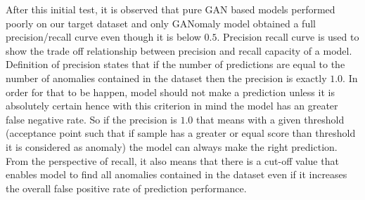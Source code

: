 After this initial test, it is observed that pure GAN based models performed poorly on our target
dataset and only GANomaly model obtained a full precision/recall curve even though it is below
$0.5$. Precision recall curve is used to show the trade off relationship between precision and
recall capacity of a model. Definition of precision states that if the number of predictions are
equal to the number of anomalies contained in the dataset then the precision is exactly $1.0$. In
order for that to be happen, model should not make a prediction unless it is absolutely certain
hence with this criterion in mind the model has an greater false negative rate. So if the precision
is $1.0$ that means with a given threshold (acceptance point such that if sample has a greater or
equal score than threshold it is considered as anomaly) the model can always make the right
prediction. From the perspective of recall, it also means that there is a cut-off value that enables
model to find all anomalies contained in the dataset even if it increases the overall false positive
rate of prediction performance.  

